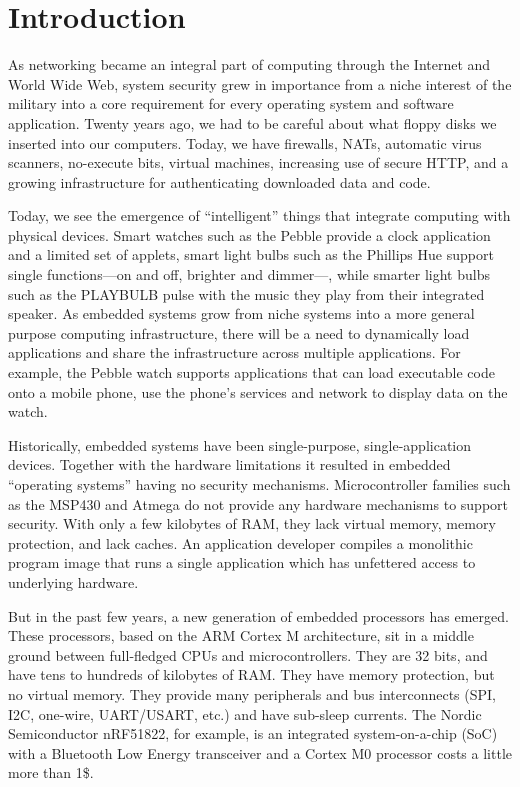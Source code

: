 \section{Introduction}

As networking became an integral part of computing through the Internet and
World Wide Web, system security grew in importance from a niche interest
of the military into a core requirement for every operating system and 
software application. Twenty years ago, we had to be careful about what
floppy disks we inserted into our computers. Today, we have firewalls,
NATs, automatic virus scanners, no-execute bits, virtual machines, 
increasing use of secure HTTP, and a growing infrastructure for 
authenticating downloaded data and code.

Today, we see the emergence of ``intelligent'' things that integrate
computing with physical devices. Smart watches such as the Pebble
provide a clock application and a limited set of applets, smart light
bulbs such as the Phillips Hue support single functions---on and off,
brighter and dimmer---, while smarter light bulbs such as the PLAYBULB
pulse with the music they play from their integrated speaker. 
As embedded systems grow from niche systems into a more general purpose
computing infrastructure, there will be a need to dynamically load 
applications and share the infrastructure across multiple applications. 
For example, the Pebble watch supports applications that can load 
executable code onto a mobile phone, use the phone's services and
network to display data on the watch. 

Historically, embedded systems have been single-purpose, single-application
devices. Together with the hardware limitations it resulted in embedded
``operating systems'' having no security mechanisms. Microcontroller families
such as the MSP430 and Atmega do not provide any hardware mechanisms to support
security. With only a few kilobytes of RAM, they lack virtual memory, memory
protection, and lack caches. An application developer compiles a monolithic
program image that runs a single application which has unfettered access to underlying hardware.

But in the past few years, a new generation of embedded processors
has emerged. These processors, based on the ARM Cortex M architecture,
sit in a middle ground between full-fledged CPUs and microcontrollers.
They are 32 bits, and have tens to hundreds of kilobytes of RAM. They have
memory protection, but no virtual memory. They provide many peripherals
and bus interconnects (SPI, I2C, one-wire, UART/USART, etc.) and
have sub-\uA sleep currents. The Nordic Semiconductor nRF51822, for example,
is an integrated system-on-a-chip (SoC) with a Bluetooth Low Energy 
transceiver and a Cortex M0 processor costs a little more than 1\$.

